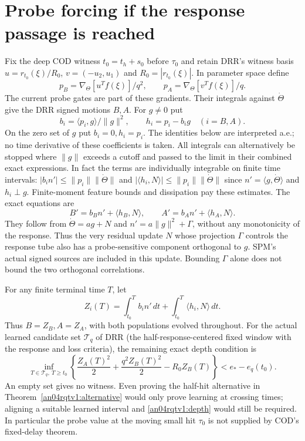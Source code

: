 \documentclass[11pt]{article}
\begin{document}
\section{Probe forcing if the response passage is reached}
Fix the deep COD witness $t_0=t_h+s_0$ before $\tau_0$ and retain
DRR's witness basis $u=r_{t_0}(\xi)/R_0$, $v=(-u_2,u_1)$ and
$R_0=|r_{t_0}(\xi)|$. In parameter space define
\[
 p_B=\nabla_\Theta[u^Tf(\xi)]/q^2,\qquad
 p_A=\nabla_\Theta[v^Tf(\xi)]/q .
\]
The current probe gates are part of these gradients. Their
integrals against $\dot\Theta$ give the DRR signed motions $B,A$.
For $g\ne0$ put
\[
 b_i=\langle p_i,g\rangle/\|g\|^2,\qquad h_i=p_i-b_i g
       \quad(i=B,A).
\]
On the zero set of $g$ put $b_i=0,h_i=p_i$. The identities below
are interpreted a.e.; no time derivative of these coefficients is
taken. All integrals can alternatively be stopped where
$\|g\|$ exceeds a cutoff and passed to the limit in their combined
exact expressions. In fact the terms are individually integrable
on finite time intervals: $|b_i n'|\le\|p_i\|\|\dot\Theta\|$
and $|\langle h_i,N\rangle|\le\|p_i\|\|\dot\Theta\|$
since $n'=\langle g,\dot\Theta\rangle$ and $h_i\perp g$.
Finite-moment feature bounds and dissipation pay these estimates.
The exact equations are
\begin{equation}\label{an04rqtv1:probe}
 B' = b_B n'+\langle h_B,N\rangle,\qquad
 A' = b_A n'+\langle h_A,N\rangle .
\end{equation}
They follow from $\dot\Theta=a g+N$ and
$n'=a\|g\|^2+\Gamma$, without any monotonicity of the response.
Thus the very residual update $N$ whose projection $\Gamma$
controls the response tube also has a probe-sensitive component
orthogonal to $g$. SPM's actual signed sources are included in
this update. Bounding $\Gamma$ alone does not bound the two
orthogonal correlations.

For any finite terminal time $T$, let
\[
 Z_i(T)=\int_{t_0}^T b_i n'\,dt+
                  \int_{t_0}^T\langle h_i,N\rangle\,dt .
\]
Thus $B=Z_B,A=Z_A$, with both populations evolved throughout.
For the actual learned candidate set $\mathcal T_q$ of DRR
(the half-response-centered fixed window with the response and
loss criteria), the remaining exact depth condition is
\begin{equation}\label{an04rqtv1:depth}
 \inf_{T\in\mathcal T_q,\ T\ge t_0}
 \left\{\frac{Z_A(T)^2}{2}+\frac{q^2Z_B(T)^2}{2}
                            -R_0Z_B(T)\right\}<e_*-e_q(t_0).
\end{equation}
An empty set gives no witness. Even proving the half-hit alternative
in Theorem~\ref{an04rqtv1:alternative} would only prove learning
at crossing times; aligning a suitable learned interval and
\eqref{an04rqtv1:depth} would still be required. In particular the
probe value at the moving small hit $\tau_0$ is not supplied by
COD's fixed-delay theorem.
\end{document}
